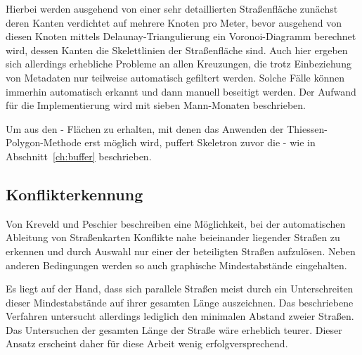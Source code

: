 \documentclass[../main/thesis.tex]{subfiles}
\begin{document}
Hierbei werden ausgehend von einer sehr detaillierten Straßenfläche zunächst deren Kanten verdichtet auf mehrere Knoten pro Meter, bevor ausgehend von diesen Knoten mittels Delaunay-Triangulierung ein Voronoi-Diagramm berechnet wird, dessen Kanten die Skelettlinien der Straßenfläche sind.
Auch hier ergeben sich allerdings erhebliche Probleme an allen Kreuzungen, die trotz Einbeziehung von Metadaten nur teilweise automatisch gefiltert werden.
Solche Fälle können immerhin automatisch erkannt und dann manuell beseitigt werden.
Der Aufwand für die Implementierung wird mit sieben Mann-Monaten beschrieben. 

Um aus den \osm- Flächen zu erhalten, mit denen das Anwenden der Thiessen-Polygon-Methode erst möglich wird, puffert Skeletron zuvor die \osm- wie in Abschnitt~\ref{ch:buffer} beschrieben. 



\subsection{Konflikterkennung}
\label{ch:conflict-detection}


Von Kreveld und Peschier beschreiben eine Möglichkeit, bei der automatischen Ableitung von Straßenkarten Konflikte nahe beieinander liegender Straßen zu erkennen und durch Auswahl nur einer der beteiligten Straßen aufzulösen.
Neben anderen Bedingungen werden so auch graphische Mindestabstände eingehalten. 

Es liegt auf der Hand, dass sich parallele Straßen meist durch ein Unterschreiten dieser Mindestabstände auf ihrer gesamten Länge auszeichnen.
Das beschriebene Verfahren untersucht allerdings lediglich den minimalen Abstand zweier Straßen.
Das Untersuchen der gesamten Länge der Straße wäre erheblich teurer. 
Dieser Ansatz erscheint daher für diese Arbeit wenig erfolgversprechend.
\end{document}
